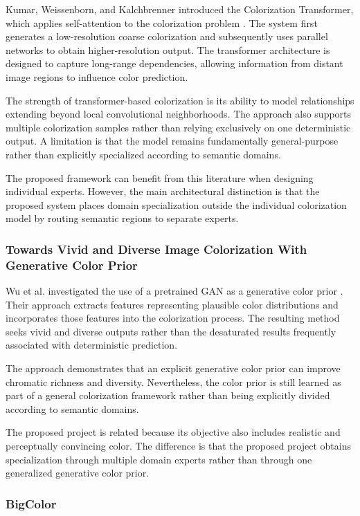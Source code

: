 \documentclass{FastFyp}
\begin{document}
Kumar, Weissenborn, and Kalchbrenner introduced the Colorization Transformer, which applies self-attention to the colorization problem \cite{ref5}. The system first generates a low-resolution coarse colorization and subsequently uses parallel networks to obtain higher-resolution output. The transformer architecture is designed to capture long-range dependencies, allowing information from distant image regions to influence color prediction.

The strength of transformer-based colorization is its ability to model relationships extending beyond local convolutional neighborhoods. The approach also supports multiple colorization samples rather than relying exclusively on one deterministic output. A limitation is that the model remains fundamentally general-purpose rather than explicitly specialized according to semantic domains.

The proposed framework can benefit from this literature when designing individual experts. However, the main architectural distinction is that the proposed system places domain specialization outside the individual colorization model by routing semantic regions to separate experts.

\subsubsection{Towards Vivid and Diverse Image Colorization With Generative Color Prior}

Wu et al. investigated the use of a pretrained GAN as a generative color prior \cite{ref6}. Their approach extracts features representing plausible color distributions and incorporates those features into the colorization process. The resulting method seeks vivid and diverse outputs rather than the desaturated results frequently associated with deterministic prediction.

The approach demonstrates that an explicit generative color prior can improve chromatic richness and diversity. Nevertheless, the color prior is still learned as part of a general colorization framework rather than being explicitly divided according to semantic domains.

The proposed project is related because its objective also includes realistic and perceptually convincing color. The difference is that the proposed project obtains specialization through multiple domain experts rather than through one generalized generative color prior.

\subsubsection{BigColor}
\end{document}
